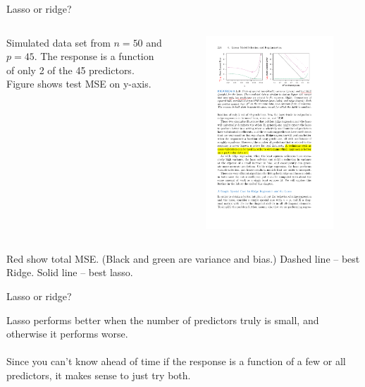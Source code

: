 \documentclass[mathserif]{beamer}
\begin{document}
\begin{frame}{Lasso or ridge?}
\begin{columns}
Simulated data set from $n=50$ and $p=45$.  The response is a function of only 2 of the 45 predictors.  Figure shows test MSE on y-axis.\\~\\
\begin{figure}
\includegraphics[scale=1]{lasso-v-ridge-2variables}
\end{figure}

\end{columns}

Red show total MSE.  (Black and green are variance and bias.) Dashed line -- best Ridge.  Solid line -- best lasso.  
\end{frame}

\begin{frame}{Lasso or ridge?}

Lasso performs better when the number of predictors truly is small, and otherwise it performs worse.  \\~\\

Since you can't know ahead of time if the response is a function of a few or all predictors, it makes sense to just try both.  

\end{frame}
\end{document}
